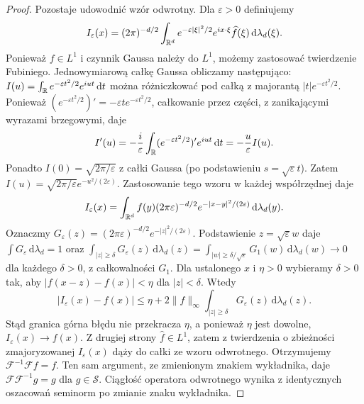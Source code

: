 \begin{proof}
Pozostaje udowodnić wzór odwrotny. Dla $\varepsilon>0$ definiujemy
\[
I_\varepsilon(x)=(2\pi)^{-d/2}\int_{\mathbb R^d}
 e^{-\varepsilon|\xi|^2/2}e^{ix\cdot\xi}
 \widehat f(\xi)\,\mathrm d\lambda_d(\xi).
\]
Ponieważ $f\in L^1$ i czynnik Gaussa należy do $L^1$,
możemy zastosować twierdzenie Fubiniego. Jednowymiarową całkę Gaussa obliczamy następująco:
$I(u)=\int_\mathbb R e^{-\varepsilon t^2/2}e^{iut}\,\mathrm dt$
można różniczkować pod całką z majorantą
$|t|e^{-\varepsilon t^2/2}$. Ponieważ
$(e^{-\varepsilon t^2/2})'=-\varepsilon t e^{-\varepsilon t^2/2}$,
całkowanie przez części, z zanikającymi wyrazami brzegowymi, daje
\[
I'(u)=-\frac{i}{\varepsilon}
\int_\mathbb R (e^{-\varepsilon t^2/2})'e^{iut}\,\mathrm dt
=-\frac u\varepsilon I(u).
\]
Ponadto $I(0)=\sqrt{2\pi/\varepsilon}$ z całki Gaussa
(po podstawieniu $s=\sqrt\varepsilon t$).
Zatem $I(u)=\sqrt{2\pi/\varepsilon}e^{-u^2/(2\varepsilon)}$.
Zastosowanie tego wzoru w każdej współrzędnej daje
\[
I_\varepsilon(x)=\int_{\mathbb R^d}f(y)
(2\pi\varepsilon)^{-d/2}e^{-|x-y|^2/(2\varepsilon)}
\,\mathrm d\lambda_d(y).
\]
Oznaczmy $G_\varepsilon(z)=(2\pi\varepsilon)^{-d/2}
e^{-|z|^2/(2\varepsilon)}$. Podstawienie $z=\sqrt\varepsilon w$
daje $\int G_\varepsilon\,\mathrm d\lambda_d=1$ oraz
$\int_{|z|\ge\delta}G_\varepsilon(z)\,\mathrm d\lambda_d(z)
=\int_{|w|\ge\delta/\sqrt\varepsilon}G_1(w)\,\mathrm d\lambda_d(w)
\to0$ dla każdego $\delta>0$, z całkowalności $G_1$.
Dla ustalonego $x$ i $\eta>0$ wybieramy $\delta>0$ tak,
aby $|f(x-z)-f(x)|<\eta$ dla $|z|<\delta$.
Wtedy
\[
|I_\varepsilon(x)-f(x)|\le
\eta+2\|f\|_\infty
\int_{|z|\ge\delta}G_\varepsilon(z)\,\mathrm d\lambda_d(z).
\]
Stąd granica górna błędu nie przekracza $\eta$, a ponieważ
$\eta$ jest dowolne, $I_\varepsilon(x)\to f(x)$.
Z drugiej strony $\widehat f\in L^1$, zatem
z twierdzenia o zbieżności zmajoryzowanej
$I_\varepsilon(x)$ dąży do całki ze wzoru odwrotnego.
Otrzymujemy $\mathcal F^{-1}\mathcal Ff=f$.
Ten sam argument, ze zmienionym znakiem wykładnika,
daje $\mathcal F\mathcal F^{-1}g=g$ dla $g\in\mathcal S$.
Ciągłość operatora odwrotnego wynika z identycznych
oszacowań seminorm po zmianie znaku wykładnika.
\end{proof}


